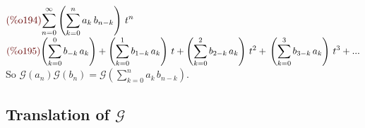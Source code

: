 \begin{math}\displaystyle
\parbox{8ex}{\color{labelcolor}(\%o194) }
\sum_{n=0}^{\infty }\left( \sum_{k=0}^{n}{a}_{k}\,{b}_{n-k}\right) \,{t}^{n}
\end{math}\\
\begin{math}\displaystyle
\parbox{8ex}{\color{labelcolor}(\%o195) }
\left( \sum_{k=0}^{0}{b}_{-k}\,{a}_{k}\right) +\left(
  \sum_{k=0}^{1}{b}_{1-k}\,{a}_{k}\right) \,t+\left(
  \sum_{k=0}^{2}{b}_{2-k}\,{a}_{k}\right) \,{t}^{2}+\\
\left( \sum_{k=0}^{3}{b}_{3-k}\,{a}_{k}\right) \,{t}^{3}+...
\end{math}\\
So $\mathcal{G}(a_n)\mathcal{G}(b_n) =\mathcal{G}\left(
  \sum_{k=0}^{n}{a}_{k}\,{b}_{n-k}\right)$.

\subsection{Translation of $\mathcal{G} $}

